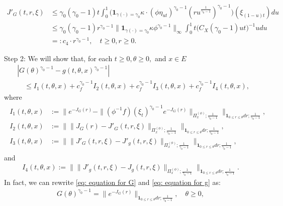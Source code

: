 \begin{align}\label{eq: upper bound for J'_G}
	J'_G(t,r,\xi)
	&\leq \gamma_0 (\gamma_0 - 1) t \int_0^1 \big( \mathbf 1_{\gamma(\cdot) = \gamma_0} \kappa \cdot (\phi \eta_{ut})^{\gamma_0 - 1} (ru^{\frac{1}{\gamma_0 - 1}})^{\gamma_0 - 1}\big) (\xi_{(1-u)t}) du
	\\&\leq \gamma_0(\gamma_0 - 1) r^{\gamma_0 - 1} \big\|   \mathbf 1_{\gamma(\cdot) = \gamma_0}  \kappa \phi^{\gamma_0 - 1} \big\|_\infty \int_0^1 t \big(  C_X(\gamma_0 - 1) ut \big)^{- 1}  u  du
	\\&=: c_4 \cdot r^{\gamma_0 - 1},
	\quad t\geq 0, r\geq 0.
\end{align}

	Step 2: We will show that, for each $t\geq 0, \theta \geq 0,$ and $x\in E$
\begin{align}
	&|  G(\theta)^{\gamma_0 - 1} - g(t,\theta,x)^{\gamma_0 - 1} |
	\\&\quad \leq I_1(t,\theta,x) +c^{\gamma_0 - 1}_f I_2(t,\theta,x)
	+c^{\gamma_0 - 1}_f I_3(t,\theta,x) + c^{\gamma_0 - 1}_f I_4(t,\theta,x),
\end{align}
	where
\begin{align}
\begin{aligned}
	I_1(t,\theta,x)
	&:= \Big\| e^{ - J_G(r)} - \| (\phi^{-1}f)(\xi_t)^{\gamma_0 - 1} e^{-J_G(r)} \|_{\Pi_x^{(\phi)};\frac{1}{\gamma_0 - 1}} \Big\|_{\mathbf 1_{0\leq r\leq \theta} dr;\frac{1}{\gamma_0 - 1}} ,
	\\I_2(t,\theta,x)
	&:= \Big\|  \|  J_G(r) - J'_G(t,r,\xi)  \|_{\Pi_x^{(\phi)};\frac{1}{\gamma_0 - 1}} \Big\|_{\mathbf 1_{0\leq r\leq \theta} dr;\frac{1}{\gamma_0 - 1}},
	\\I_3(t,\theta,x)
	&:= \Big\| \|  J'_G(t,r,\xi) - J'_g(t,r,\xi)  \|_{\Pi_x^{(\phi)};\frac{1}{\gamma_0 - 1}} \Big\|_{\mathbf 1_{0\leq r\leq \theta} dr;\frac{1}{\gamma_0 - 1}},
\end{aligned}
\end{align}
	and
\begin{align}
	I_4(t,\theta,x)
	:= \Big\| \| J'_g(t,r,\xi) - J_g(t,r,\xi)  \|_{\Pi_x^{(\phi)};\frac{1}{\gamma_0 - 1}} \Big\|_{\mathbf 1_{0\leq r\leq \theta} dr;\frac{1}{\gamma_0 - 1}}.
\end{align}
	In fact, we can rewrite \eqref{eq: equation for G} and \eqref{eq: equation for g} as:
\begin{align}
	G(\theta)^{\gamma_0 - 1} =
	\| e^{ - J_G(r)} \|_{\mathbf 1_{0\leq r\leq \theta} dr;\frac{1}{\gamma_0 - 1}},
	\quad \theta \geq 0,
\end{align}	
